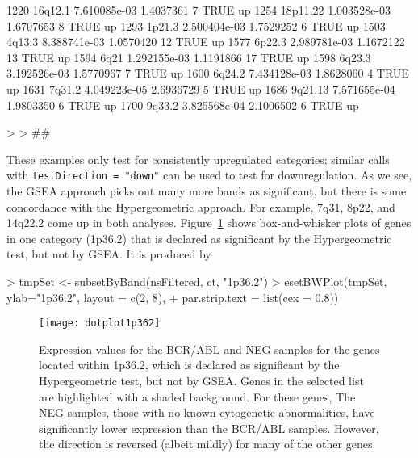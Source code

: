 \documentclass[11pt]{article}
\begin{document}
\begin{Schunk}
\begin{Soutput}
1220  16q12.1 7.610085e-03 1.4037361    7        TRUE            up
1254 18p11.22 1.003528e-03 1.6707653    8        TRUE            up
1293   1p21.3 2.500404e-03 1.7529252    6        TRUE            up
1503   4q13.3 8.388741e-03 1.0570420   12        TRUE            up
1577   6p22.3 2.989781e-03 1.1672122   13        TRUE            up
1594     6q21 1.292155e-03 1.1191866   17        TRUE            up
1598   6q23.3 3.192526e-03 1.5770967    7        TRUE            up
1600   6q24.2 7.434128e-03 1.8628060    4        TRUE            up
1631   7q31.2 4.049223e-05 2.6936729    5        TRUE            up
1686  9q21.13 7.571655e-04 1.9803350    6        TRUE            up
1700   9q33.2 3.825568e-04 2.1006502    6        TRUE            up
\end{Soutput}
\begin{Sinput}
> 
> ##
\end{Sinput}
\end{Schunk}
These examples only test for consistently upregulated categories;
similar calls with \texttt{testDirection = "down"} can be used to test
for downregulation.  As we see, the GSEA approach picks out many more
bands as significant, but there is some concordance with the
Hypergeometric approach.  For example, 7q31, 8p22, and 14q22.2 come up
in both analyses.  Figure~\ref{fig:dotplot1p362} shows box-and-whisker
plots of genes in one category (1p36.2) that is declared as
significant by the Hypergeometric test, but not by GSEA.  It is
produced by
\begin{Schunk}
\begin{Sinput}
> tmpSet <- subsetByBand(nsFiltered, ct, "1p36.2")
> esetBWPlot(tmpSet, ylab="1p36.2", layout = c(2, 8),
+            par.strip.text = list(cex = 0.8))
\end{Sinput}
\end{Schunk}
%
\begin{figure}[tb]
\begin{center}
  \texttt{[image: dotplot1p362]}
\end{center}
\caption{Expression values for the BCR/ABL and NEG samples for the
  genes located within 1p36.2, which is declared as significant by the
  Hypergeometric test, but not by GSEA.  Genes in the selected list
  are highlighted with a shaded background.  For these genes, The NEG
  samples, those with no known cytogenetic abnormalities, have
  significantly lower expression than the BCR/ABL samples.  However,
  the direction is reversed (albeit mildly) for many of the other
  genes.  }

\label{fig:dotplot1p362}
\end{figure}



\end{document}
